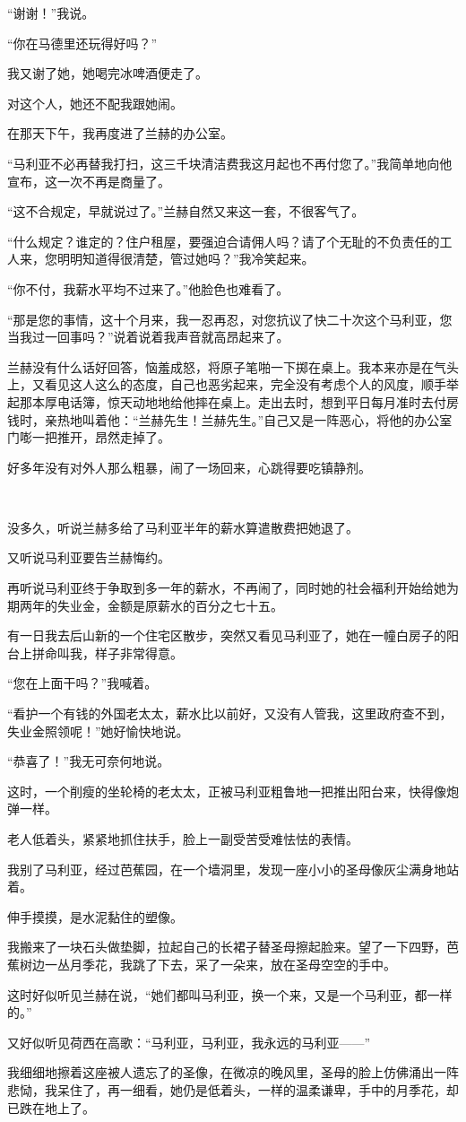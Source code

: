 \par “谢谢！”我说。
\par “你在马德里还玩得好吗？”
\par 我又谢了她，她喝完冰啤酒便走了。
\par 对这个人，她还不配我跟她闹。
\par 在那天下午，我再度进了兰赫的办公室。
\par “马利亚不必再替我打扫，这三千块清洁费我这月起也不再付您了。”我简单地向他宣布，这一次不再是商量了。
\par “这不合规定，早就说过了。”兰赫自然又来这一套，不很客气了。
\par “什么规定？谁定的？住户租屋，要强迫合请佣人吗？请了个无耻的不负责任的工人来，您明明知道得很清楚，管过她吗？”我冷笑起来。
\par “你不付，我薪水平均不过来了。”他脸色也难看了。
\par “那是您的事情，这十个月来，我一忍再忍，对您抗议了快二十次这个马利亚，您当我过一回事吗？”说着说着我声音就高昂起来了。
\par 兰赫没有什么话好回答，恼羞成怒，将原子笔啪一下掷在桌上。我本来亦是在气头上，又看见这人这么的态度，自己也恶劣起来，完全没有考虑个人的风度，顺手举起那本厚电话簿，惊天动地地给他摔在桌上。走出去时，想到平日每月准时去付房钱时，亲热地叫着他：“兰赫先生！兰赫先生。”自己又是一阵恶心，将他的办公室门嘭一把推开，昂然走掉了。
\par 好多年没有对外人那么粗暴，闹了一场回来，心跳得要吃镇静剂。
\par  
\par 没多久，听说兰赫多给了马利亚半年的薪水算遣散费把她退了。
\par 又听说马利亚要告兰赫悔约。
\par 再听说马利亚终于争取到多一年的薪水，不再闹了，同时她的社会福利开始给她为期两年的失业金，金额是原薪水的百分之七十五。
\par 有一日我去后山新的一个住宅区散步，突然又看见马利亚了，她在一幢白房子的阳台上拼命叫我，样子非常得意。
\par “您在上面干吗？”我喊着。
\par “看护一个有钱的外国老太太，薪水比以前好，又没有人管我，这里政府查不到，失业金照领呢！”她好愉快地说。
\par “恭喜了！”我无可奈何地说。
\par 这时，一个削瘦的坐轮椅的老太太，正被马利亚粗鲁地一把推出阳台来，快得像炮弹一样。
\par 老人低着头，紧紧地抓住扶手，脸上一副受苦受难怯怯的表情。
\par 我别了马利亚，经过芭蕉园，在一个墙洞里，发现一座小小的圣母像灰尘满身地站着。
\par 伸手摸摸，是水泥黏住的塑像。
\par 我搬来了一块石头做垫脚，拉起自己的长裙子替圣母擦起脸来。望了一下四野，芭蕉树边一丛月季花，我跳了下去，采了一朵来，放在圣母空空的手中。
\par 这时好似听见兰赫在说，“她们都叫马利亚，换一个来，又是一个马利亚，都一样的。”
\par 又好似听见荷西在高歌：“马利亚，马利亚，我永远的马利亚——”
\par 我细细地擦着这座被人遗忘了的圣像，在微凉的晚风里，圣母的脸上仿佛涌出一阵悲恸，我呆住了，再一细看，她仍是低着头，一样的温柔谦卑，手中的月季花，却已跌在地上了。

